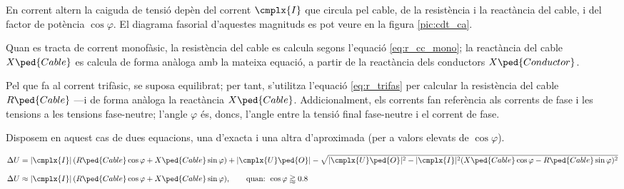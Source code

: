 En corrent altern la caiguda de tensió
depèn del  corrent $\cmplx{I}$ que circula pel cable, de la
resistència i la reactància del  cable, i del factor de
potència $\cos \varphi$. El diagrama fasorial d'aquestes magnituds
es pot veure en la figura \vref{pic:cdt_ca}.

\begin{center}
   
   \label{pic:cdt_ca}
\end{center}

Quan es tracta de corrent monofàsic, la resistència del cable es calcula segons l'equació
\eqref{eq:r_cc_mono}; la reactància del cable $X\ped{Cable}$ es calcula de forma anàloga
amb la mateixa equació, a partir de la reactància dels conductors $X\ped{Conductor}$.

Pel que fa al corrent trifàsic, se suposa equilibrat; per tant, s'utilitza l'equació
\eqref{eq:r_trifas} per calcular la resistència del cable $R\ped{Cable}$ ---i de forma
anàloga la reactància $X\ped{Cable}$. Addicionalment, els corrents fan referència als
corrents de fase i les tensions a les tensions fase-neutre; l'angle $\varphi$ és, doncs,
 l'angle entre la tensió final fase-neutre i el corrent de fase.

Disposem en aquest cas de dues equacions, una d'exacta i una altra d'aproximada (per a valors elevats de $\cos \varphi$).

\begin{subequations}
\begin{align}
   \Delta U &= |\cmplx{I}| \,( R\ped{Cable} \cos \varphi + X\ped{Cable} \sin \varphi) + |\cmplx{U}\ped{O}| - \sqrt{|\cmplx{U}\ped{O}|^2 - |\cmplx{I}|^2 ( X\ped{Cable} \cos \varphi - R\ped{Cable} \sin \varphi )^2} \label{eq:cdt_trif_exact} \\[2ex]
   \Delta U &\approx |\cmplx{I}| \,( R\ped{Cable} \cos \varphi + X\ped{Cable} \sin \varphi), \qquad \text{quan: } \cos \varphi \gtrapprox \num{0,8} \label{eq:cdt_trif_aprox}
\end{align}
\end{subequations}


